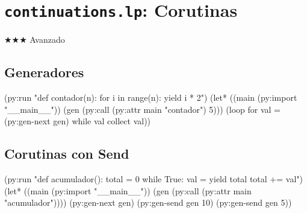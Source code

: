 \chapter{\texttt{continuations.lp}: Corutinas}
\label{chap:continuations}
{\huge$\bigstar$}{\huge$\bigstar$}{\huge$\bigstar$} Avanzado

\section{Generadores}
\begin{lispcode}
(py:run "def contador(n):
    for i in range(n): yield i * 2")
(let* ((main (py:import "__main__"))
       (gen (py:call (py:attr main "contador") 5)))
  (loop for val = (py:gen-next gen) while val collect val))
\end{lispcode}

\section{Corutinas con Send}
\begin{lispcode}
(py:run "def acumulador():
    total = 0
    while True:
        val = yield total
        total += val")
(let* ((main (py:import "__main__")) (gen (py:call (py:attr main "acumulador"))))
  (py:gen-next gen)
  (py:gen-send gen 10)
  (py:gen-send gen 5))
\end{lispcode}

